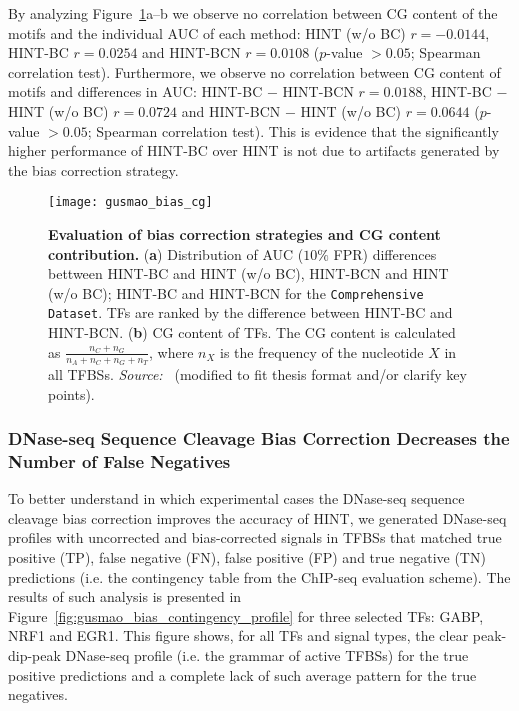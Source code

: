 By analyzing Figure~\ref{fig:gusmao_bias_cg}a--b we observe no correlation between CG content of the motifs and the individual AUC of each method: HINT (w/o BC) $ r = -0.0144$, HINT-BC $ r = 0.0254$ and HINT-BCN $ r = 0.0108$ ($p$-value $> 0.05$; Spearman correlation test). Furthermore, we observe no correlation between CG content of motifs and differences in AUC: HINT-BC $-$ HINT-BCN $ r = 0.0188$, HINT-BC $-$ HINT (w/o BC) $ r = 0.0724$ and HINT-BCN $-$ HINT (w/o BC) $ r = 0.0644$ ($p$-value $> 0.05$; Spearman correlation test). This is evidence that the significantly higher performance of HINT-BC over HINT is not due to artifacts generated by the bias correction strategy.

\begin{figure}[h!]
\centering
\texttt{[image: gusmao\_bias\_cg]}
\caption[Evaluation of bias correction strategies and CG content contribution]{\textbf{Evaluation of bias correction strategies and CG content contribution.} (\textbf{a}) Distribution of AUC ($10\%$ FPR) differences bettween HINT-BC and HINT (w/o BC), HINT-BCN and HINT (w/o BC); HINT-BC and HINT-BCN for the {\tt Comprehensive Dataset}. TFs are ranked by the difference between HINT-BC and HINT-BCN. (\textbf{b}) CG content of TFs. The CG content is calculated as $\frac{n_C+n_G}{n_A+n_C+n_G+n_T}$, where $n_X$ is the frequency of the nucleotide $X$ in all TFBSs. \emph{Source:~\cite{gusmao2016}} (modified to fit thesis format and/or clarify key points).}
\label{fig:gusmao_bias_cg}
\end{figure}

\subsubsection{DNase-seq Sequence Cleavage Bias Correction Decreases the Number of False Negatives}

To better understand in which experimental cases the DNase-seq sequence cleavage bias correction improves the accuracy of HINT, we generated DNase-seq profiles with uncorrected and bias-corrected signals in TFBSs that matched true positive (TP), false negative (FN), false positive (FP) and true negative (TN) predictions (i.e. the contingency table from the ChIP-seq evaluation scheme). The results of such analysis is presented in Figure~\ref{fig:gusmao_bias_contingency_profile} for three selected TFs: GABP, NRF1 and EGR1. This figure shows, for all TFs and signal types, the clear peak-dip-peak DNase-seq profile (i.e. the grammar of active TFBSs) for the true positive predictions and a complete lack of such average pattern for the true negatives.

